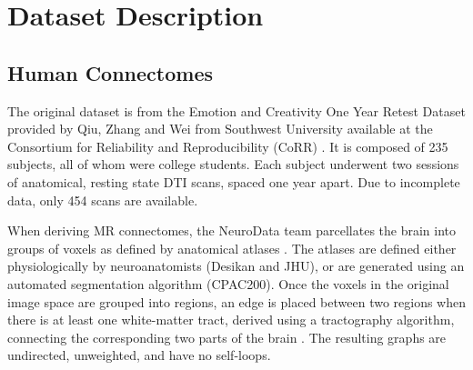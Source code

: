 \documentclass[journal,twoside,web]{ieeecolor}
\newcommand{\Ex}{\mathbb{E}}
\begin{document}

\section{Dataset Description}
\label{section:data}

\subsection{Human Connectomes}
\label{section:data_human}

The original dataset is from the Emotion and Creativity One Year Retest Dataset provided by Qiu, Zhang and Wei from Southwest University available at the Consortium for Reliability and Reproducibility (CoRR) . It is composed of 235 subjects, all of whom were college students. Each subject underwent two sessions of anatomical, resting state DTI scans, spaced one year apart. Due to incomplete data, only 454 scans are available.

When deriving MR connectomes, the NeuroData team parcellates the brain into groups of voxels as defined by anatomical atlases . The atlases are defined either physiologically by neuroanatomists (Desikan and JHU), or are generated using an automated segmentation algorithm (CPAC200).
Once the voxels in the original image space are grouped into regions, an edge is placed between two regions when there is at least one white-matter tract, derived using a tractography algorithm, connecting the corresponding two parts of the brain .
The resulting graphs are undirected, unweighted, and have no self-loops.
\end{document}
